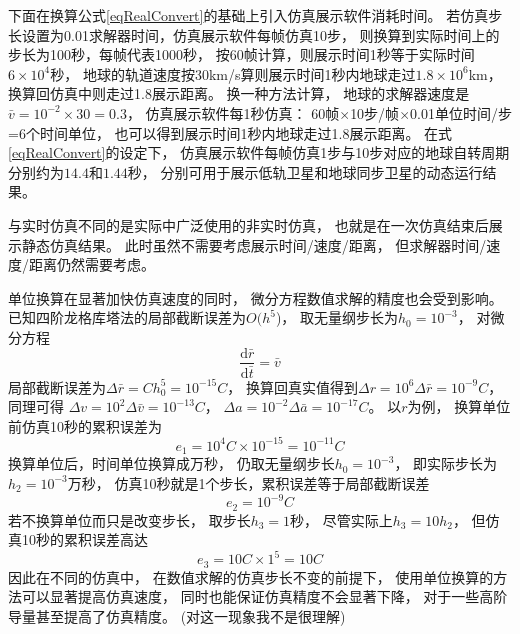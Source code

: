 下面在换算公式\eqref{eqRealConvert}的基础上引入仿真展示软件消耗时间。
若仿真步长设置为0.01求解器时间，仿真展示软件每帧仿真10步，
则换算到实际时间上的步长为100秒，每帧代表1000秒，
按60帧计算，则展示时间1秒等于实际时间$6\times10^4$秒，
地球的轨道速度按30km/s算则展示时间1秒内地球走过$1.8\times10^6$km，
换算回仿真中则走过1.8展示距离。
换一种方法计算，
地球的求解器速度是$\bar{v}=10^{-2}\times30=0.3$，
仿真展示软件每1秒仿真：
60帧$\times$10步/帧$\times$0.01单位时间/步=6个时间单位，
也可以得到展示时间1秒内地球走过1.8展示距离。
在式\eqref{eqRealConvert}的设定下，
仿真展示软件每帧仿真1步与10步对应的地球自转周期分别约为$14.4$和$1.44$秒，
分别可用于展示低轨卫星和地球同步卫星的动态运行结果。

与实时仿真不同的是实际中广泛使用的非实时仿真，
也就是在一次仿真结束后展示静态仿真结果。
此时虽然不需要考虑展示时间/速度/距离，
但求解器时间/速度/距离仍然需要考虑。

单位换算在显著加快仿真速度的同时，
微分方程数值求解的精度也会受到影响。
已知四阶龙格库塔法的局部截断误差为$O(h^5$)\cite{mqingyang2019}，
取无量纲步长为$h_0=10^{-3}$，
对微分方程
\[\frac{\text{d}\bar{r}}{\text{d}\bar{t}}=\bar{v}\]
局部截断误差为$\Delta\bar{r}=Ch_0^5=10^{-15}C$，
换算回真实值得到$\Delta r=10^6\Delta\bar{r}=10^{-9}C$，
同理可得
$\Delta v=10^2\Delta\bar{v}=10^{-13}C$，
$\Delta a=10^{-2}\Delta\bar{a}=10^{-17}C$。
以$r$为例，
换算单位前仿真10秒的累积误差为
\[e_1=10^4C\times 10^{-15}=10^{-11}C\]
换算单位后，时间单位换算成万秒，
仍取无量纲步长$h_0=10^{-3}$，
即实际步长为$h_2=10^{-3}$万秒，
仿真10秒就是1个步长，累积误差等于局部截断误差
\[e_2=10^{-9}C\]
若不换算单位而只是改变步长，
取步长$h_3=1$秒，
尽管实际上$h_3=10h_2$，
但仿真10秒的累积误差高达
\[e_3=10C\times 1^5=10C\]
因此在不同的仿真中，
在数值求解的仿真步长不变的前提下，
使用单位换算的方法可以显著提高仿真速度，
同时也能保证仿真精度不会显著下降，
对于一些高阶导量甚至提高了仿真精度。
(对这一现象我不是很理解)
